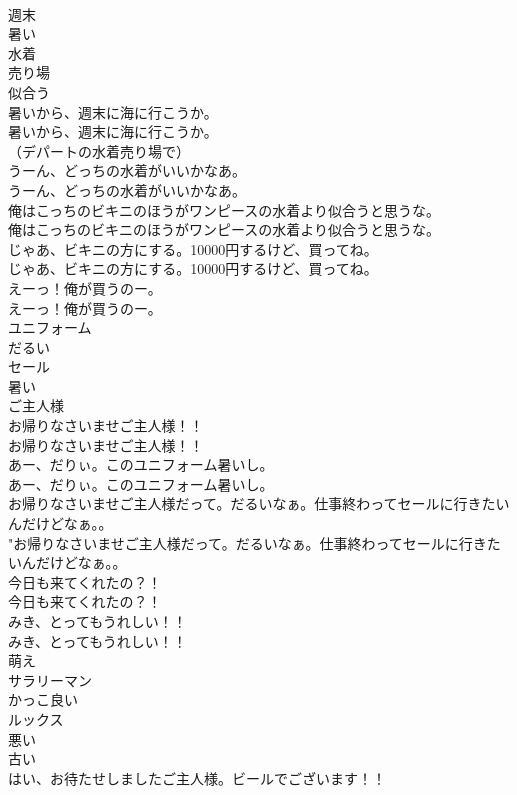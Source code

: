 \documentclass[8pt]{extreport}
\begin{document}
\begin{CJK}{UTF8}{min}
\\	週末
\\	暑い
\\	水着
\\	売り場
\\	似合う
\\	暑いから、週末に海に行こうか。	
\\	暑いから、週末に海に行こうか。 
\\	（デパートの水着売り場で）	
\\	うーん、どっちの水着がいいかなあ。	
\\	うーん、どっちの水着がいいかなあ。 
\\	俺はこっちのビキニのほうがワンピースの水着より似合うと思うな。	
\\	俺はこっちのビキニのほうがワンピースの水着より似合うと思うな。 
\\	じゃあ、ビキニの方にする。10000円するけど、買ってね。	
\\	じゃあ、ビキニの方にする。10000円するけど、買ってね。 
\\	えーっ！俺が買うのー。	
\\	えーっ！俺が買うのー。 
\\	ユニフォーム
\\	だるい
\\	セール
\\	暑い
\\	ご主人様
\\	お帰りなさいませご主人様！！	
\\	お帰りなさいませご主人様！！ 
\\	あー、だりぃ。このユニフォーム暑いし。	
\\	あー、だりぃ。このユニフォーム暑いし。 
\\	お帰りなさいませご主人様だって。だるいなぁ。仕事終わってセールに行きたいんだけどなぁ。。	
\\	"お帰りなさいませご主人様だって。だるいなぁ。仕事終わってセールに行きたいんだけどなぁ。。 
\\	今日も来てくれたの？！	
\\	今日も来てくれたの？！ 
\\	みき、とってもうれしい！！	
\\	みき、とってもうれしい！！ 
\\	萌え
\\	サラリーマン
\\	かっこ良い
\\	ルックス
\\	悪い
\\	古い
\\	はい、お待たせしましたご主人様。ビールでございます！！	

\end{CJK}
\end{document}
